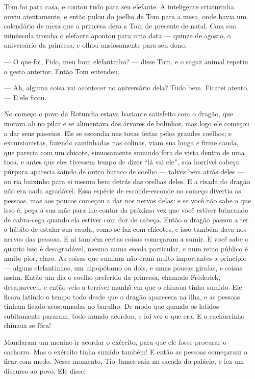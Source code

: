 Tom foi para casa, e contou tudo para seu elefante. A inteligente
criaturinha ouviu atentamente, e então pulou do joelho de Tom para a
mesa, onde havia um calendário de mesa que a princesa dera a Tom de
presente de natal. Com sua minúscula tromba o elefante apontou para
uma data — quinze de agosto, o aniversário da princesa, e olhou
ansiosamente para seu dono.

— O que foi, Fido, meu bom elefantinho? — disse Tom, e o sagaz animal
repetiu o gesto anterior. Então Tom entendeu.

— Ah, alguma coisa vai acontecer no aniversário dela? Tudo bem.
Ficarei atento. — E ele ficou.

No começo o povo da Rotundia estava bastante satisfeito com o dragão,
que morava ali no pilar e se alimentava das árvores de bolinhos, mas
logo ele começou a dar seus passeios. Ele se escondia nas tocas
feitas pelos grandes coelhos; e excursionistas, fazendo caminhadas
nas colinas, viam sua longa e firme cauda, que parecia com um
chicote, sinuosamente sumindo fora de vista dentro de uma toca, e
antes que eles tivessem tempo de dizer “lá vai ele”, sua horrível
cabeça púrpura aparecia saindo de outro buraco de coelho — talvez bem
atrás deles — ou ria baixinho para si mesmo bem detrás das orelhas
deles. E a risada do dragão não era nada agradável. Essa espécie de
esconde-esconde no começo divertia as pessoas, mas aos poucos começou
a dar nos nervos delas: e se você não sabe o que isso é, peça a sua
mãe para lhe contar da próxima vez que você estiver brincando de
cabra-cega quando ela estiver com dor de cabeça. Então o dragão
passou a ter o hábito de estalar sua cauda, como se faz com chicotes,
e isso também dava nos nervos das pessoas. E aí também certas coisas
começaram a sumir. E você sabe o quanto isso é desagradável, mesmo
numa escola particular, e num reino público é muito pior, claro. As
coisas que sumiam não eram muito importantes a príncipio — alguns
elefantinhos, um hipopótamo ou dois, e umas poucas girafas, e coisas
assim. Então um dia o coelho preferido da princesa, chamado
Frederick, desapareceu, e então veio a terrível manhã em que o
chiuaua tinha sumido. Ele ficara latindo o tempo todo desde que o
dragão aparecera na ilha, e as pessoas tinham ficado acostumadas ao
barulho. De modo que quando os latidos subitamente pararam, todo
mundo acordou, e foi ver o que era. E o cachorrinho chiuaua se fôra!

Mandaram um menino ir acordar o exército, para que ele fosse procurar
o cachorro. Mas o exército tinha sumido também! E então as pessoas
começaram a ficar com medo. Nesse momento, Tio James saiu na sacada
do palácio, e fez um discurso ao povo. Ele disse:

